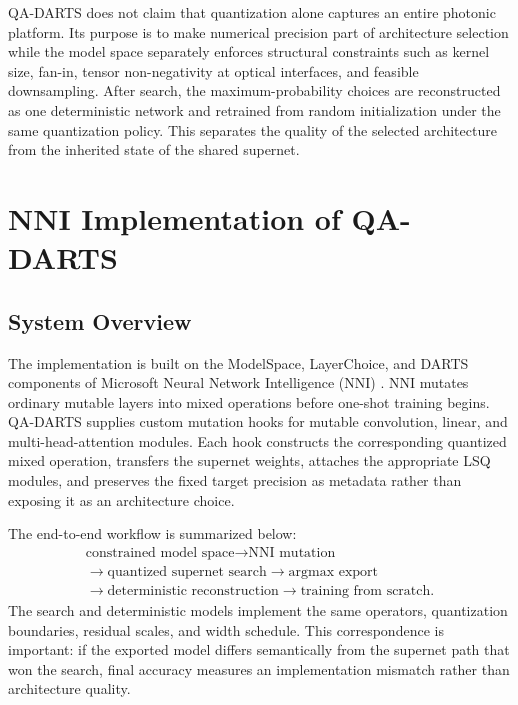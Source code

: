 \documentclass[lettersize,journal]{IEEEtran}
\begin{document}
QA-DARTS does not claim that quantization alone captures an entire photonic platform. Its purpose is to make numerical precision part of architecture selection while the model space separately enforces structural constraints such as kernel size, fan-in, tensor non-negativity at optical interfaces, and feasible downsampling. After search, the maximum-probability choices are reconstructed as one deterministic network and retrained from random initialization under the same quantization policy. This separates the quality of the selected architecture from the inherited state of the shared supernet.

\section{NNI Implementation of QA-DARTS}
\subsection{System Overview}
The implementation is built on the ModelSpace, LayerChoice, and DARTS components of Microsoft Neural Network Intelligence (NNI) \cite{nni}. NNI mutates ordinary mutable layers into mixed operations before one-shot training begins. QA-DARTS supplies custom mutation hooks for mutable convolution, linear, and multi-head-attention modules. Each hook constructs the corresponding quantized mixed operation, transfers the supernet weights, attaches the appropriate LSQ modules, and preserves the fixed target precision as metadata rather than exposing it as an architecture choice.

The end-to-end workflow is summarized below:
\begin{equation*}
\begin{array}{c}
\text{constrained model space}
\rightarrow\text{NNI mutation}\\[2pt]
\rightarrow\text{quantized supernet search}
\rightarrow\text{argmax export}\\[2pt]
\rightarrow\text{deterministic reconstruction}
\rightarrow\text{training from scratch}.
\end{array}
\end{equation*}
The search and deterministic models implement the same operators, quantization boundaries, residual scales, and width schedule. This correspondence is important: if the exported model differs semantically from the supernet path that won the search, final accuracy measures an implementation mismatch rather than architecture quality.
\end{document}
